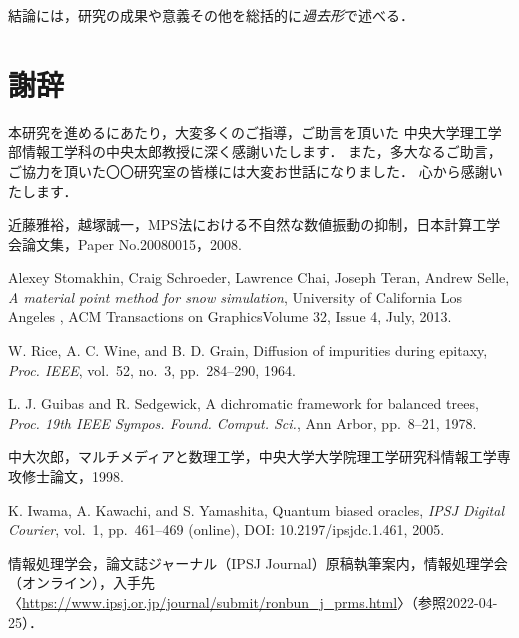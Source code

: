 \documentclass[a4j,12pt]{jreport}
\def\syaji{ \chapter*{謝辞} \addcontentsline{toc}{chapter}{謝辞}}
\begin{document}
結論には，研究の成果や意義その他を総括的に{\em 過去形}で述べる．



\syaji
\par
本研究を進めるにあたり，大変多くのご指導，ご助言を頂いた
中央大学理工学部情報工学科の中央太郎教授に深く感謝いたします．
また，多大なるご助言，ご協力を頂いた〇〇研究室の皆様には大変お世話になりました．
心から感謝いたします．


\begin{thebibliography}{99}

近藤雅裕，越塚誠一，MPS法における不自然な数値振動の抑制，日本計算工学会論文集，Paper No.20080015，2008. 

Alexey Stomakhin, Craig Schroeder, Lawrence Chai, Joseph Teran, Andrew Selle, \textit{A material point method for snow simulation}, University of California Los Angeles , ACM Transactions on GraphicsVolume 32, Issue 4, July, 2013.

W. Rice, A. C. Wine, and B. D. Grain, Diffusion of impurities during epitaxy, \textit{Proc. IEEE}, vol.~52, no.~3, pp.~284--290, 1964.

L. J. Guibas and R. Sedgewick, A dichromatic framework for balanced trees, 
\textit{Proc. 19th IEEE Sympos. Found. Comput. Sci.}, Ann Arbor, pp.~8--21, 1978.

中大次郎，マルチメディアと数理工学，中央大学大学院理工学研究科情報工学専攻修士論文，1998.

K. Iwama, A. Kawachi, and S. Yamashita, Quantum biased oracles, \textit{IPSJ Digital Courier}, vol.~1, pp.~461--469 (online), DOI: 10.2197/ipsjdc.1.461, 2005.

情報処理学会，論文誌ジャーナル（IPSJ Journal）原稿執筆案内，情報処理学会（オンライン），入手先〈\url{https://www.ipsj.or.jp/journal/submit/ronbun_j_prms.html}〉（参照2022-04-25）．


\end{thebibliography}

\end{document}
